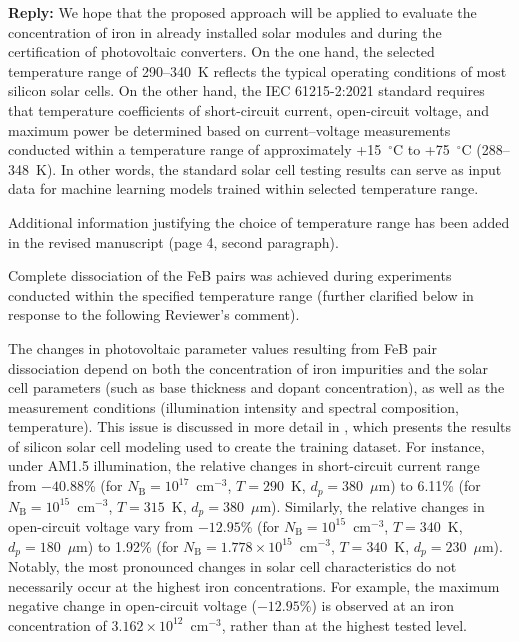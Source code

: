 \documentclass[a4paper,fleqn]{cas-sc}
\begin{document}
\noindent
\textcolor[rgb]{0.51,0.00,0.00}{\textbf{Reply:}}
We hope that the proposed approach will be applied to evaluate the concentration of iron in already installed solar modules
and during the certification of photovoltaic converters.
On the one hand, the selected temperature range of 290–340~K reflects the typical operating conditions of most silicon solar cells.
On the other hand, the IEC 61215-2:2021 \cite{IEC61215} standard requires that temperature coefficients of
short-circuit current, open-circuit voltage, and maximum power be determined based on current–voltage measurements conducted
within a temperature range of approximately +15~$^\circ$C to +75~$^\circ$C (288–348~K).
In other words, the standard solar cell testing results can serve as input data for machine learning models trained within selected temperature range.

Additional information justifying the choice of temperature range has been added in the revised manuscript (page 4, second paragraph).


Complete dissociation of the FeB pairs was achieved during experiments conducted within the specified temperature range
(further clarified below in response to the following Reviewer's comment).


The changes in photovoltaic parameter values resulting from FeB pair dissociation depend on
both the concentration of iron impurities and the solar cell parameters
(such as base thickness and dopant concentration),
as well as the measurement conditions (illumination intensity and spectral composition, temperature).
This issue is discussed in more detail in \cite{Olikh2025MSEB},
which presents the results of silicon solar cell modeling used to create the training dataset.
For instance, under AM1.5 illumination, the relative changes in short-circuit current range
from $-40.88$\%
(for $N_\mathrm{B}=10^{17}$~cm$^{-3}$, $T=290$~K, $d_p=380$~$\mu$m)
to 6.11\%
(for $N_\mathrm{B}=10^{15}$~cm$^{-3}$, $T=315$~K, $d_p=380$~$\mu$m).
Similarly, the relative changes in open-circuit voltage vary from
$-12.95$\%
(for $N_\mathrm{B}=10^{15}$~cm$^{-3}$, $T=340$~K, $d_p=180$~$\mu$m)
to 1.92\%
(for $N_\mathrm{B}=1.778\times10^{15}$~cm$^{-3}$, $T=340$~K, $d_p=230$~$\mu$m).
Notably, the most pronounced changes in solar cell characteristics do not necessarily occur at the highest iron concentrations.
For example, the maximum negative change in open-circuit voltage ($-12.95$\%)
is observed at an iron concentration of $3.162\times10^{12}$~cm$^{-3}$,
rather than at the highest tested level.
\end{document}
